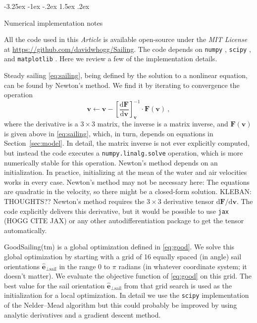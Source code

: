 \documentclass[letterpaper]{article}
\makeatletter
\newcommand{\dd}{\mathrm{d}}
\renewcommand{\vec}[1]{\boldsymbol{#1}}
\newcommand{\uvec}{\vec{\hat{e}}}
\newcommand{\sail}{\text{sail}}
\newcommand{\documentname}{\textsl{Article}}
\newcommand{\secref}[1]{Section~\ref{#1}}
\newcommand{\code}[1]{\texttt{#1}}
\renewcommand\section{\@startsection {section}{1}{\z@}%
  {-3.25ex \@plus -1ex \@minus -.2ex}%
  {1.5ex \@plus .2ex}%
  {\raggedright\normalfont\large\bfseries}}
\makeatother
\begin{document}
\section{Numerical implementation notes}\label{sec:implementation}

All the code used in this \documentname{} is available open-source under the \textsl{MIT License} at \url{https://github.com/davidwhogg/Sailing}.
The code depends on \code{numpy} \cite{numpy}, \code{scipy} \cite{scipy}, and \code{matplotlib} \cite{matplotlib}.
Here we review a few of the implementation details.

Steady sailing \eqref{eq:sailing}, being defined by the solution to a nonlinear equation, can be found by Newton's method.
We find it by iterating to convergence the operation
\begin{equation}
    \vec{v} \leftarrow \vec{v} - \left[\frac{\dd \vec{F}}{\dd \vec{v}}\right]_{\vec{v}}^{-1}\cdot \vec{F}(\vec{v}) ~,
\end{equation}
where the derivative is a $3\times 3$ matrix, the inverse is a matrix inverse, and $\vec{F}(\vec{v})$ is given above in \eqref{eq:sailing}, which, in turn, depends on equations in \secref{sec:model}.
In detail, the matrix inverse is not ever explicitly computed, but instead the code executes a \code{numpy.linalg.solve} \cite{numpy} operation, which is more numerically stable for this operation.
Newton's method depends on an initialization.
In practice, initializing at the mean of the water and air velocities works in every case.
Newton's method may not be necessary here: The equations are quadratic in the velocity, so there might be a closed-form solution. KLEBAN: THOUGHTS??
Newton's method requires the $3\times 3$ derivative tensor $\dd\vec{F}/\dd\vec{v}$.
The code explicitly delivers this derivative, but it would be possible to use \code{jax} (HOGG CITE JAX) or any other autodifferentiation package to get the tensor automatically.

GoodSailing(tm) is a global optimization defined in \eqref{eq:good}.
We solve this global optimization by starting with a grid of 16 equally spaced (in angle) sail orientations $\uvec_{\perp\sail}$ in the range 0 to $\pi$ radians (in whatever coordinate system; it doesn't matter).
We evaluate the objective function of \eqref{eq:good} on this grid.
The best value for the sail orientation $\uvec_{\perp\sail}$ from that grid search is used as the initialization for a local optimization.
In detail we use the \code{scipy} \cite{scipy} implementation of the Nelder--Mead algorithm \cite{nelder-mead} but this could probably be improved by using analytic derivatives and a gradient descent method.
\end{document}

